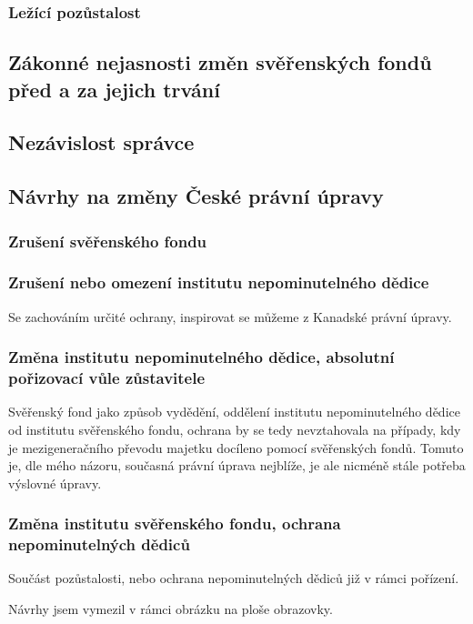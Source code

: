 \documentclass{article}
\begin{document}

\subsubsection{Ležící pozůstalost}

\subsection{Zákonné nejasnosti změn svěřenských fondů před a za jejich trvání}

\subsection{Nezávislost správce}

\subsection{Návrhy na změny České právní úpravy}
\subsubsection{Zrušení svěřenského fondu}
\subsubsection{Zrušení nebo omezení institutu nepominutelného dědice}
Se zachováním určité ochrany, inspirovat se můžeme z Kanadské právní úpravy.
\subsubsection{Změna institutu nepominutelného dědice, absolutní pořizovací vůle zůstavitele}
Svěřenský fond jako způsob vydědění, oddělení institutu nepominutelného dědice od institutu svěřenského fondu, ochrana by se tedy nevztahovala na případy, kdy je mezigeneračního převodu majetku docíleno pomocí svěřenských fondů. Tomuto je, dle mého názoru, současná právní úprava nejblíže, je ale nicméně stále potřeba výslovné úpravy.
\subsubsection{Změna institutu svěřenského fondu, ochrana nepominutelných dědiců}
Součást pozůstalosti, nebo ochrana nepominutelných dědiců již v rámci pořízení.

Návrhy jsem vymezil v rámci obrázku na ploše obrazovky.
\end{document}
